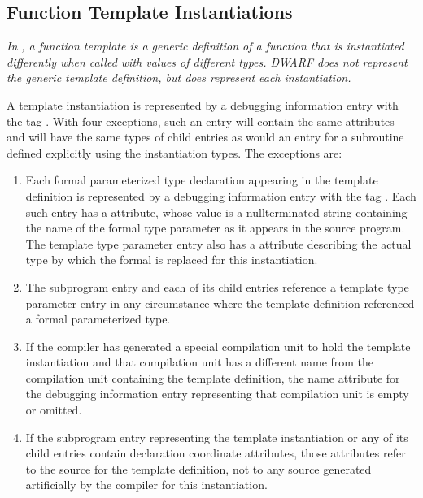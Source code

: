 \subsection{Function Template Instantiations}
\label{chap:functiontemplateinstantiations}

\textit{In , a function template is a generic definition of
a function that is instantiated differently when called with
values of different types. DWARF does not represent the generic
template definition, but does represent each instantiation.}

A template instantiation is represented by a debugging
information entry with the tag . With four
exceptions, such an entry will contain the same attributes and
will have the same types of child entries as would an entry
for a subroutine defined explicitly using the instantiation
types. The exceptions are:

\begin{enumerate}[1.]
\item Each formal parameterized type declaration appearing in the
template definition is represented by a debugging information
entry with the 
tag . 
Each
such entry has a  attribute, whose value is a
null\dash terminated string containing the name of the formal
type parameter as it appears in the source program. The
template type parameter entry also has a  attribute
describing the actual type by which the formal is replaced
for this instantiation.

\item The subprogram entry and each of its child entries reference
a template type parameter entry in any circumstance where
the template definition referenced a formal parameterized type.

\item If the compiler has generated a special compilation unit
to hold the template instantiation and that compilation unit
has a different name from the compilation unit containing
the template definition, the name attribute for the debugging
information entry representing that compilation unit is empty
or omitted.

\item If the subprogram entry representing the template
instantiation or any of its child entries contain declaration
coordinate attributes, those attributes refer to the source
for the template definition, not to any source generated
artificially by the compiler for this instantiation.
\end{enumerate}



